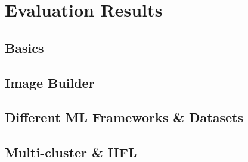 \section{Evaluation Results}

\subsection{Basics}

\subsection{Image Builder}

\subsection{Different ML Frameworks \& Datasets}

\subsection{Multi-cluster \& HFL}